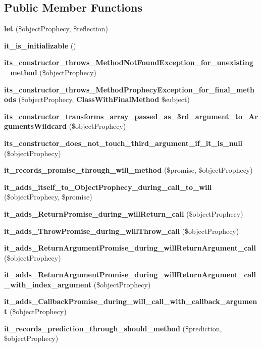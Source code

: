 \subsection*{Public Member Functions}
\begin{DoxyCompactItemize}
\item 
{\bf let} (\$object\+Prophecy, \$reflection)
\item 
{\bf it\+\_\+is\+\_\+initializable} ()
\item 
{\bf its\+\_\+constructor\+\_\+throws\+\_\+\+Method\+Not\+Found\+Exception\+\_\+for\+\_\+unexisting\+\_\+method} (\$object\+Prophecy)
\item 
{\bf its\+\_\+constructor\+\_\+throws\+\_\+\+Method\+Prophecy\+Exception\+\_\+for\+\_\+final\+\_\+methods} (\$object\+Prophecy, {\bf Class\+With\+Final\+Method} \$subject)
\item 
{\bf its\+\_\+constructor\+\_\+transforms\+\_\+array\+\_\+passed\+\_\+as\+\_\+3rd\+\_\+argument\+\_\+to\+\_\+\+Arguments\+Wildcard} (\$object\+Prophecy)
\item 
{\bf its\+\_\+constructor\+\_\+does\+\_\+not\+\_\+touch\+\_\+third\+\_\+argument\+\_\+if\+\_\+it\+\_\+is\+\_\+null} (\$object\+Prophecy)
\item 
{\bf it\+\_\+records\+\_\+promise\+\_\+through\+\_\+will\+\_\+method} (\$promise, \$object\+Prophecy)
\item 
{\bf it\+\_\+adds\+\_\+itself\+\_\+to\+\_\+\+Object\+Prophecy\+\_\+during\+\_\+call\+\_\+to\+\_\+will} (\$object\+Prophecy, \$promise)
\item 
{\bf it\+\_\+adds\+\_\+\+Return\+Promise\+\_\+during\+\_\+will\+Return\+\_\+call} (\$object\+Prophecy)
\item 
{\bf it\+\_\+adds\+\_\+\+Throw\+Promise\+\_\+during\+\_\+will\+Throw\+\_\+call} (\$object\+Prophecy)
\item 
{\bf it\+\_\+adds\+\_\+\+Return\+Argument\+Promise\+\_\+during\+\_\+will\+Return\+Argument\+\_\+call} (\$object\+Prophecy)
\item 
{\bf it\+\_\+adds\+\_\+\+Return\+Argument\+Promise\+\_\+during\+\_\+will\+Return\+Argument\+\_\+call\+\_\+with\+\_\+index\+\_\+argument} (\$object\+Prophecy)
\item 
{\bf it\+\_\+adds\+\_\+\+Callback\+Promise\+\_\+during\+\_\+will\+\_\+call\+\_\+with\+\_\+callback\+\_\+argument} (\$object\+Prophecy)
\item 
{\bf it\+\_\+records\+\_\+prediction\+\_\+through\+\_\+should\+\_\+method} (\$prediction, \$object\+Prophecy)
\item 

\end{DoxyCompactItemize}
